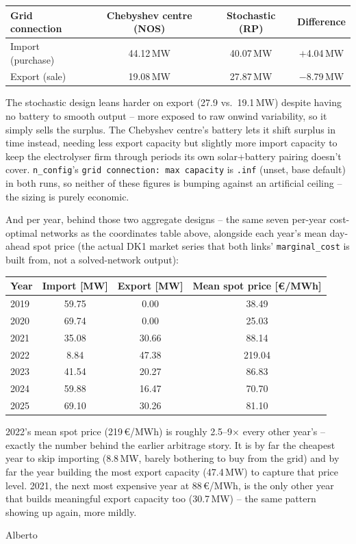 \documentclass[11pt]{article}
\begin{document}
\begin{center}
\small
\begin{tabular}{@{}lccc@{}}
\toprule
Grid connection & Chebyshev centre (NOS) & Stochastic (RP) & Difference \\
\midrule
Import (purchase) & 44.12\,MW & 40.07\,MW &  $+$4.04\,MW \\
Export (sale)      & 19.08\,MW & 27.87\,MW &  $-$8.79\,MW \\
\bottomrule
\end{tabular}
\end{center}

The stochastic design leans harder on export (27.9 vs.\ 19.1\,MW) despite
having no battery to smooth output -- more exposed to raw onwind
variability, so it simply sells the surplus. The Chebyshev centre's
battery lets it shift surplus in time instead, needing less export
capacity but slightly more import capacity to keep the electrolyser firm
through periods its own solar+battery pairing doesn't cover.
\texttt{n\_config}'s \texttt{grid connection: max capacity} is
\texttt{.inf} (unset, base default) in both runs, so neither of these
figures is bumping against an artificial ceiling -- the sizing is purely
economic.

And per year, behind those two aggregate designs -- the same seven
per-year cost-optimal networks as the coordinates table above, alongside
each year's mean day-ahead spot price (the actual DK1 market series that
both links' \texttt{marginal\_cost} is built from, not a solved-network
output):

\begin{center}
\footnotesize
\begin{tabular}{@{}lccc@{}}
\toprule
Year & Import [MW] & Export [MW] & Mean spot price [€/MWh] \\
\midrule
2019 & 59.75 & 0.00  & 38.49 \\
2020 & 69.74 & 0.00  & 25.03 \\
2021 & 35.08 & 30.66 & 88.14 \\
2022 &  8.84 & 47.38 & 219.04 \\
2023 & 41.54 & 20.27 & 86.83 \\
2024 & 59.88 & 16.47 & 70.70 \\
2025 & 69.10 & 30.26 & 81.10 \\
\bottomrule
\end{tabular}
\end{center}

2022's mean spot price (219\,€/MWh) is roughly 2.5--9$\times$ every other
year's -- exactly the number behind the earlier arbitrage story. It is by
far the cheapest year to skip importing (8.8\,MW, barely bothering to buy
from the grid) and by far the year building the most export capacity
(47.4\,MW) to capture that price level. 2021, the next most expensive year
at 88\,€/MWh, is the only other year that builds meaningful export
capacity too (30.7\,MW) -- the same pattern showing up again, more mildly.

Alberto
\end{document}
